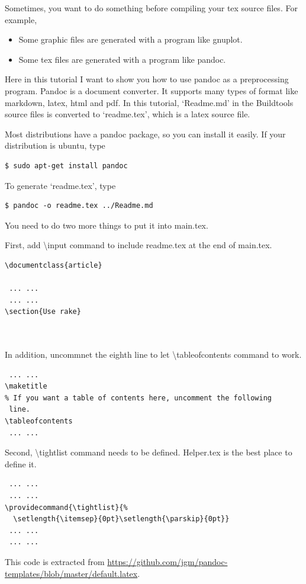 Sometimes, you want to do something before compiling your tex source files.
For example,
\begin{itemize}
\item Some graphic files are generated with a program like gnuplot.
\item Some tex files are generated with a program like pandoc.
\end{itemize}

Here in this tutorial I want to show you how to use pandoc as a preprocessing program.
Pandoc is a document converter.
It supports many types of format like markdown, latex, html and pdf.
In this tutorial, `Readme.md' in the Buildtools source files is converted to `readme.tex', which is a latex source file.

Most distributions have a pandoc package, so you can install it easily.
If your distribution is ubuntu, type
\begin{verbatim}
$ sudo apt-get install pandoc
\end{verbatim}

To generate `readme.tex', type
\begin{verbatim}
$ pandoc -o readme.tex ../Readme.md
\end{verbatim}

You need to do two more things to put it into main.tex.

First, add {\textbackslash}input command to include readme.tex at the end of main.tex.
\begin{verbatim}
\documentclass{article}

 ... ...
 ... ...
\section{Use rake}
  


\end{verbatim}
In addition, uncommnet the eighth line to let {\textbackslash}tableofcontents command to work.
\begin{verbatim}
 ... ...
\maketitle
% If you want a table of contents here, uncomment the following
 line.
\tableofcontents
 ... ...
\end{verbatim}

Second, {\textbackslash}tightlist command needs to be defined.
Helper.tex is the best place to define it.
\begin{verbatim}
 ... ...
 ... ...
\providecommand{\tightlist}{%
  \setlength{\itemsep}{0pt}\setlength{\parskip}{0pt}}
 ... ...
 ... ...
\end{verbatim}
This code is extracted from \url{https://github.com/jgm/pandoc-templates/blob/master/default.latex}.

